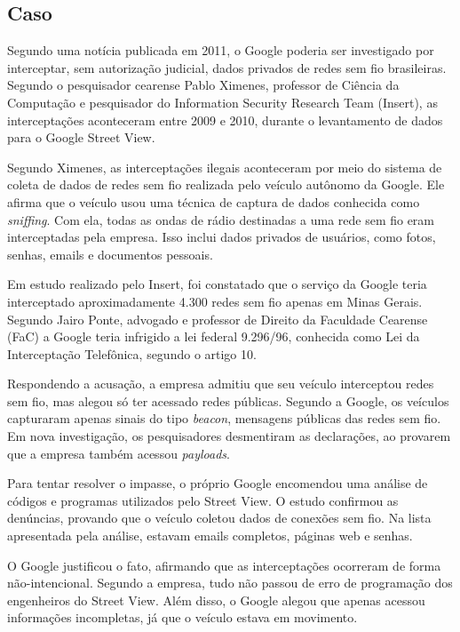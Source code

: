 \subsection{Caso \label{sec:caso}}

Segundo uma notícia publicada em 2011, o Google poderia ser investigado por interceptar, sem autorização judicial, dados privados de redes sem fio brasileiras. Segundo o pesquisador cearense Pablo Ximenes, professor de Ciência da Computação e pesquisador do Information Security Research Team (Insert), as interceptações aconteceram entre 2009 e 2010, durante o levantamento de dados para o Google Street View.~\cite{bib:caso}

Segundo Ximenes, as interceptações ilegais aconteceram por meio do sistema de coleta de dados de redes sem fio realizada pelo veículo autônomo da Google. Ele afirma que o veículo usou uma técnica de captura de dados conhecida como \textit{sniffing}. Com ela, todas as ondas de rádio destinadas a uma rede sem fio eram interceptadas pela empresa. Isso inclui dados privados de usuários, como fotos, senhas, emails e documentos pessoais.

Em estudo realizado pelo Insert, foi constatado que o serviço da Google teria interceptado aproximadamente 4.300 redes sem fio apenas em Minas Gerais. Segundo Jairo Ponte, advogado e professor de Direito da Faculdade Cearense (FaC) a Google teria infrigido a lei federal 9.296/96, conhecida como Lei da Interceptação Telefônica, segundo o artigo 10.

Respondendo a acusação, a empresa admitiu que seu veículo interceptou redes sem fio, mas alegou só ter acessado redes públicas. Segundo a Google, os veículos capturaram apenas sinais do tipo \textit{beacon}, mensagens públicas das redes sem fio. Em nova investigação, os pesquisadores desmentiram as declarações, ao provarem que a empresa também acessou \textit{payloads}.

Para tentar resolver o impasse, o próprio Google encomendou uma análise de códigos e programas utilizados pelo Street View. O estudo confirmou as denúncias, provando que o veículo coletou dados de conexões sem fio. Na lista apresentada pela análise, estavam emails completos, páginas web e senhas.

O Google justificou o fato, afirmando que as interceptações ocorreram de forma não-intencional. Segundo a empresa, tudo não passou de erro de programação dos engenheiros do Street View. Além disso, o Google alegou que apenas acessou informações incompletas, já que o veículo estava em movimento.

